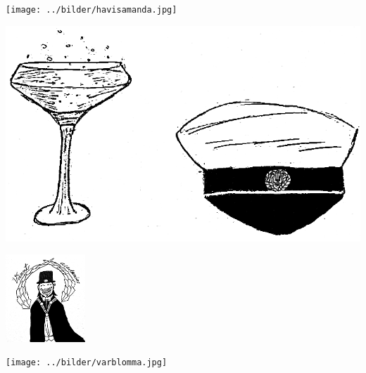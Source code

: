 
\begin{intersong}
\sffamily\bfseries\LARGE{}
\begin{center}
\texttt{[image: ../bilder/havisamanda.jpg]} 
\end{center}
\end{intersong}
\sclearpage

\begin{intersong}
\begin{center}
\includegraphics[width=1\textwidth]{../bilder/fardigabilder/CamillasFardigaBilder/Studentsangen2.png} 
\end{center}
\end{intersong}
\sclearpage

\begin{intersong}
	\begin{center}
		\includegraphics[width=3cm]{../bilder/fardigabilder/CamillasFardigaBilder/GaudeamusIgitur.png} 
	\end{center}
\end{intersong}



\sclearpage

\sclearpage

\sclearpage

\sclearpage

\sclearpage

\begin{intersong}
\begin{center}
\texttt{[image: ../bilder/varblomma.jpg]} 
\end{center}
\end{intersong}
\sclearpage

\sclearpage
